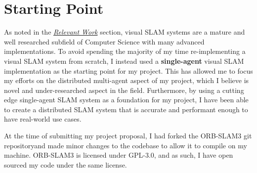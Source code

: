 




\label{sec:2}

\section{Starting Point}
\label{sec:2.1}
As noted in the \hyperref[sec:1.1]{\textit{Relevant Work}} section, visual SLAM systems are a mature and well researched subfield of Computer Science with many advanced implementations. To avoid spending the majority of my time re-implementing a visual SLAM system from scratch, I instead used a \textbf{single-agent} visual SLAM implementation as the starting point for my project. This has allowed me to focus my efforts on the distributed multi-agent aspect of my project, which I believe is novel and under-researched aspect in the field. Furthermore, by using a cutting edge single-agent SLAM system as a foundation for my project, I have been able to create a distributed SLAM system that is accurate and performant enough to have real-world use cases.

At the time of submitting my project proposal, I had forked the ORB-SLAM3 \autocite{ORBSLAM3_TRO} git repository\footnotemark[1] and made minor changes to the codebase to allow it to compile on my machine. ORB-SLAM3 is licensed under GPL-3.0, and as such, I have open sourced my code under the same license\footnotemark[2].

